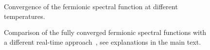 \begin{figure}[h]
	\centering
	\caption[Convergence of fermion spectral function at different temperatures]{Convergence of the fermionic spectral function at different temperatures.}
	\label{fig:spec-convergence}
\end{figure}


\begin{figure}[h]
	\centering
	\caption[Comparison of spectral functions with the Keldysh approach]{Comparison of the fully converged fermionic spectral functions with a different real-time approach~\cite{Lang2023}, see explanations in the main text.}
	\label{fig:spec-comparison}
\end{figure}


